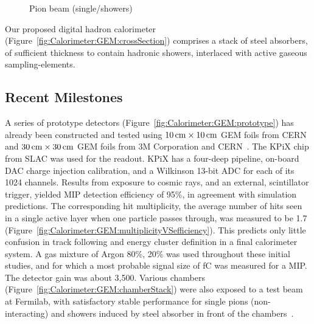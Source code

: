 \begin{figure}
\begin{minipage}{.33\textwidth}
		\caption{Pion beam (single/showers)}
		\label{fig:Calorimeter:GEM:pionBeam}
	\end{minipage}
\end{figure}
Our proposed digital hadron calorimeter (Figure~\ref{fig:Calorimeter:GEM:crossSection}) comprises a stack of steel absorbers, of sufficient thickness to contain hadronic showers, interlaced with active gaseous sampling-elements.

\subsection{Recent Milestones}
A series of prototype detectors (Figure~\ref{fig:Calorimeter:GEM:prototype}) has already been constructed and tested using $\unit[10]{cm} \times \unit[10]{cm}$ GEM foils from CERN and $\unit[30]{cm} \times \unit[30]{cm}$ GEM foils from 3M Corporation and CERN~\cite{1742-6596-404-1-012031}. The KPiX chip from SLAC was used for the readout. KPiX has a four-deep pipeline, on-board DAC charge injection calibration, and a Wilkinson 13-bit ADC for each of its 1024 channels. Results from exposure to cosmic rays, and an external, scintillator trigger, yielded MIP detection efficiency of 95\%, in agreement with simulation predictions. The corresponding hit multiplicity, the average number of hits seen in a single active layer when one particle passes through, was measured to be 1.7 (Figure~\ref{fig:Calorimeter:GEM:multiplicityVSefficiency}).
This predicts only little confusion in track following and energy cluster definition in a final calorimeter system. A gas mixture of Argon 80\%,  20\% was used throughout these initial studies, and for which a most probable signal size of \unit[10]{fC} was measured for a MIP. The detector gain was about 3,500. Various chambers (Figure~\ref{fig:Calorimeter:GEM:chamberStack}) were also exposed to a test beam at Fermilab, with satisfactory stable performance for single pions (non-interacting) and showers induced by steel absorber in front of the chambers~\cite{White:GEM:SiDWS2015}.
